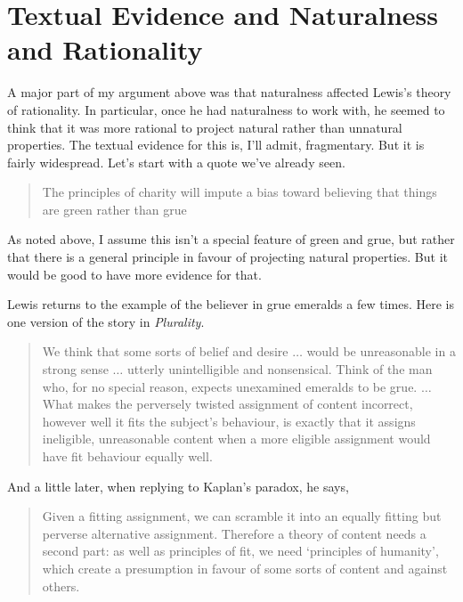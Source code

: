 \section{Textual Evidence and Naturalness and Rationality}

A major part of my argument above was that naturalness affected Lewis's theory of rationality. In particular, once he had naturalness to work with, he seemed to think that it was more rational to project natural rather than unnatural properties. The textual evidence for this is, I'll admit, fragmentary. But it is fairly widespread. Let's start with a quote we've already seen.

\begin{quote}
The principles of charity will impute a bias toward believing that things are green rather than grue \citep[375]{Lewis1983e}
\end{quote}

\noindent As noted above, I assume this isn't a special feature of green and grue, but rather that there is a general principle in favour of projecting natural properties. But it would be good to have more evidence for that.

Lewis returns to the example of the believer in grue emeralds a few times. Here is one version of the story in \textit{Plurality}.

\begin{quote}
We think that some sorts of belief and desire $\dots$ would be unreasonable in a strong sense $\dots$ utterly unintelligible and nonsensical. Think of the man who, for no special reason, expects unexamined emeralds to be grue. $\dots$ What makes the perversely twisted assignment of content incorrect, however well it fits the subject's behaviour, is exactly that it assigns ineligible, unreasonable content when a more eligible assignment would have fit behaviour equally well. \citep[38-9]{Lewis1986a}
\end{quote}

\noindent And a little later, when replying to Kaplan's paradox, he says,

\begin{quote}
Given a fitting assignment, we can scramble it into an equally fitting but perverse alternative assignment. Therefore a theory of content needs a second part: as well as principles of fit, we need `principles of humanity', which create a presumption in favour of some sorts of content and against others.  \citep[107]{Lewis1986a}
\end{quote}

